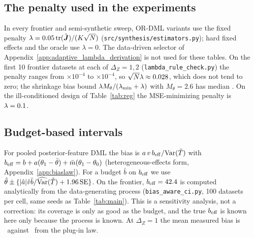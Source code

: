 \subsection{The penalty used in the experiments}
In every frontier and semi-synthetic sweep, OR-DML variants use the fixed penalty $\lambda=0.05\,\mathrm{tr}(\hat{\boldsymbol{J}})/(K\sqrt N)$ (\texttt{src/synthesis/estimators.py}); hard fixed effects and the oracle use $\lambda=0$. The data-driven selector of Appendix~\ref{app:adaptive_lambda_derivation} is not used for these tables. On the first 10 frontier datasets at each of $\Delta_Z=1,2$ (\texttt{lambda\_rule\_check.py}) the penalty ranges from \RbLamLo$\times10^{-4}$ to \RbLamHi$\times10^{-4}$, so $\sqrt N\lambda\approx0.028$, which does not tend to zero; the shrinkage bias bound $\lambda M_\theta/(\lambda_{\min}+\lambda)$ with $M_\theta=2.6$ has median \RbShrinkBound. On the ill-conditioned design of Table~\ref{tab:reg} the MSE-minimizing penalty is $\lambda=0.1$.

\subsection{Budget-based intervals}
For pooled posterior-feature DML the bias is $a\,v\,b_{\rm eff}/\mathrm{Var}(\tilde T)$ with $b_{\rm eff}=b+a(\theta_1-\bar\theta)+\bar m(\theta_1-\theta_0)$ (heterogeneous-effects form, Appendix~\ref{app:biaslaw}). For a budget $\bar b$ on $b_{\rm eff}$ we use $\hat\theta\pm\{|\hat a|\hat v\bar b/\widehat{\mathrm{Var}}(\tilde T)+1.96\,\mathrm{SE}\}$. On the frontier, $b_{\rm eff}=42.4$ is computed analytically from the data-generating process (\texttt{bias\_aware\_ci.py}, 100 datasets per cell, same seeds as Table~\ref{tab:main}). This is a sensitivity analysis, not a correction: its coverage is only as good as the budget, and the true $b_{\rm eff}$ is known here only because the process is known. At $\Delta_Z=1$ the mean measured bias is \RbBAMeasOne\ against \RbBALawOne\ from the plug-in law.
\begin{table}[h]\centering\footnotesize
\caption{Coverage of the sample ATE by budget-based intervals for posterior-feature DML, by budget (\texttt{reports/rebuttal/bias\_aware\_ci\_summary.csv}).}\label{tab:budget}

\end{table}

